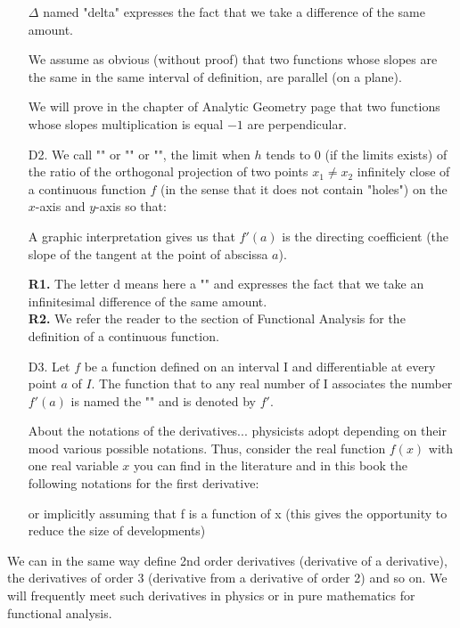 \begin{enumerate}
	\begin{tcolorbox}[title=Remark,colframe=black,arc=10pt]
$\Delta$ named "delta" expresses the fact that we take a difference of the same amount.
	\end{tcolorbox}
We assume as obvious (without proof) that two functions whose slopes are the same in the same interval of definition, are parallel (on a plane).
	\begin{tcolorbox}[title=Remark,colframe=black,arc=10pt]
We will prove in the chapter of Analytic Geometry page \pageref{equation of the straight line} that two functions whose slopes multiplication is equal $-1$ are perpendicular.
	\end{tcolorbox}
	\item[D2.] We call "" or "" or "", the limit when $h$ tends to $0$ (if the limits exists) of the ratio of the orthogonal projection of two points $x_1\neq x_2$ infinitely close  of a continuous function $f$ (in the sense that it does not contain "holes") on the $x$-axis and $y$-axis so that:
	
A graphic interpretation gives us that $f'(a)$ is the directing coefficient (the slope of the tangent at the point of abscissa $a$).
	\begin{tcolorbox}[title=Remarks,colframe=black,arc=10pt]
	\textbf{R1.} The letter $\mathrm{d}$ means here a "" and expresses the fact that we take an infinitesimal difference of the same amount.\\

	\textbf{R2.} We refer the reader to the section of Functional Analysis for the definition of a continuous function.
	\end{tcolorbox}
	\item[D3.] Let $f$ be a function defined on an interval I and differentiable at every point $a$ of $I$. The function that to any real number of I associates the number $f'(a)$ is named the "" and is denoted by $f'$.
	\begin{tcolorbox}[title=Remark,colframe=black,arc=10pt]
About the notations of the derivatives... physicists adopt depending on their mood various possible notations. Thus, consider the real function $f(x)$  with one real variable $x$ you can find in the literature and in this book the following notations for the first derivative:
	
or implicitly assuming that f is a function of x (this gives the opportunity to reduce the size of developments)
	
	\end{tcolorbox}
\end{enumerate}
We can in the same way define 2nd order derivatives (derivative of a derivative), the derivatives of order 3 (derivative from a derivative of order 2) and so on. We will  frequently meet such derivatives in physics or in pure mathematics for functional analysis.

